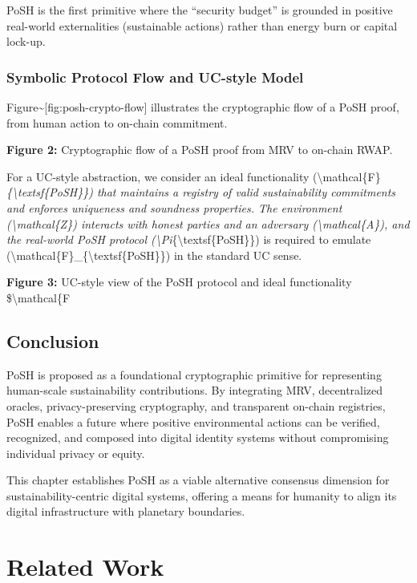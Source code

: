 \documentclass{article}
\begin{document}
PoSH is the first primitive where the ``security budget'' is grounded in
positive real-world externalities (sustainable actions) rather than energy
burn or capital lock-up.

\subsubsection{Symbolic Protocol Flow and UC-style Model}

Figure{\textasciitilde}[fig:posh-crypto-flow] illustrates the cryptographic flow of a PoSH
proof, from human action to on-chain commitment.

\textbf{Figure 2:} Cryptographic flow of a PoSH proof from MRV to on-chain RWAP.

For a UC-style abstraction, we consider an ideal functionality
({\textbackslash}mathcal\{F\}\textit{\{{\textbackslash}textsf\{PoSH\}\}) that maintains a registry of valid sustainability
commitments and enforces uniqueness and soundness properties. The environment
({\textbackslash}mathcal\{Z\}) interacts with honest parties and an adversary ({\textbackslash}mathcal\{A\}),
and the real-world PoSH protocol ({\textbackslash}Pi}\{{\textbackslash}textsf\{PoSH\}\}) is required to emulate
({\textbackslash}mathcal\{F\}\_\{{\textbackslash}textsf\{PoSH\}\}) in the standard UC sense.

\textbf{Figure 3:} UC-style view of the PoSH protocol and ideal functionality
\${\textbackslash}mathcal\{F

\subsection{Conclusion}

PoSH is proposed as a foundational cryptographic primitive for representing
human-scale sustainability contributions. By integrating MRV, decentralized
oracles, privacy-preserving cryptography, and transparent on-chain registries,
PoSH enables a future where positive environmental actions can be verified,
recognized, and composed into digital identity systems without compromising
individual privacy or equity.

This chapter establishes PoSH as a viable alternative consensus dimension for
sustainability-centric digital systems, offering a means for humanity to align
its digital infrastructure with planetary boundaries.

\section{Related Work}
\end{document}
